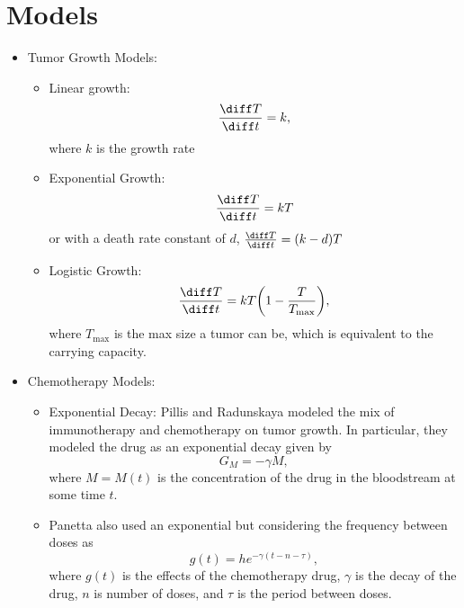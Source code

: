 \documentclass[11pt]{amsart}
\begin{document}
\section{Models}
\label{appendix: models}
\begin{itemize}

	\item Tumor Growth Models:
		\begin{itemize}
	\item Linear growth: 
		\begin{equation}
			\frac{\diff T}{\diff t} = k,
			\label{eq: lin}
		\end{equation}
		where $k$ is the growth rate
	\item Exponential Growth:
		\begin{equation}
			\frac{\diff T}{\diff t} = kT \label{eq: exp}
		\end{equation}
	 or with a death rate constant of $d$, $\frac{\diff T}{\diff t} = (k-d)T$
	\item Logistic Growth: 
		\begin{equation}
			\frac{\diff T}{\diff t} = kT \biggl(1- \frac{T}{T_{\max}}\biggr)\label{eq: logistic},
		\end{equation}
		where $T_{\max}$ is the max size a tumor can be, which is equivalent to the carrying capacity.
		\end{itemize}
		
	\item Chemotherapy Models: 
		\begin{itemize}
			\item Exponential Decay: Pillis and Radunskaya modeled the mix of immunotherapy and chemotherapy on tumor growth. In particular, they modeled the drug as an exponential decay given by 
				\begin{equation}
					G_M = -\gamma M \label{eq: Pillis},
				\end{equation}
				where $M=M(t)$ is the concentration of the drug in the bloodstream at some time $t$.
				
			\item Panetta also used an exponential but considering the frequency between doses as
				\begin{equation}
					g(t) = h e^{-\gamma(t-n-\tau)} \label{eq:PanettaExpDec},
				\end{equation}
				where $g(t)$ is the effects of the chemotherapy drug, $\gamma$ is the decay of the drug, $n$ is number of doses, and $\tau$ is the period between doses.
				

\end{itemize}
\end{itemize}
\end{document}
